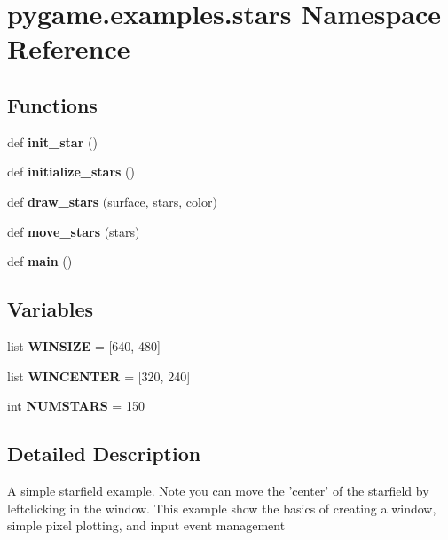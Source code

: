 \hypertarget{namespacepygame_1_1examples_1_1stars}{}\section{pygame.\+examples.\+stars Namespace Reference}
\label{namespacepygame_1_1examples_1_1stars}
\subsection*{Functions}
\begin{DoxyCompactItemize}
\item 
\mbox{\label{namespacepygame_1_1examples_1_1stars_a69d2f8eee886475332be311da219e310}} 
def {\bfseries init\+\_\+star} ()
\item 
\mbox{\label{namespacepygame_1_1examples_1_1stars_a1b0309b55005e7ec4ee787333d442405}} 
def {\bfseries initialize\+\_\+stars} ()
\item 
\mbox{\label{namespacepygame_1_1examples_1_1stars_aa15bad107ac71b790bd43580e3c7369a}} 
def {\bfseries draw\+\_\+stars} (surface, stars, color)
\item 
\mbox{\label{namespacepygame_1_1examples_1_1stars_aeb8e03cee94cbc3ad02f300410bbd3d5}} 
def {\bfseries move\+\_\+stars} (stars)
\item 
\mbox{\label{namespacepygame_1_1examples_1_1stars_a925c56a892cea6ba71959587a9442c05}} 
def {\bfseries main} ()
\end{DoxyCompactItemize}
\subsection*{Variables}
\begin{DoxyCompactItemize}
\item 
\mbox{\label{namespacepygame_1_1examples_1_1stars_a498c07568db1277ab7ead24dd1b87c69}} 
list {\bfseries W\+I\+N\+S\+I\+ZE} = \mbox{[}640, 480\mbox{]}
\item 
\mbox{\label{namespacepygame_1_1examples_1_1stars_a528f6801f5042c2a87a12613eb9ff045}} 
list {\bfseries W\+I\+N\+C\+E\+N\+T\+ER} = \mbox{[}320, 240\mbox{]}
\item 
\mbox{\label{namespacepygame_1_1examples_1_1stars_aecd59c7372ef111a78aef621602fbb65}} 
int {\bfseries N\+U\+M\+S\+T\+A\+RS} = 150
\end{DoxyCompactItemize}


\subsection{Detailed Description}
\begin{DoxyVerb}A simple starfield example. Note you can move the 'center' of
the starfield by leftclicking in the window. This example show
the basics of creating a window, simple pixel plotting, and input
event management\end{DoxyVerb}
 